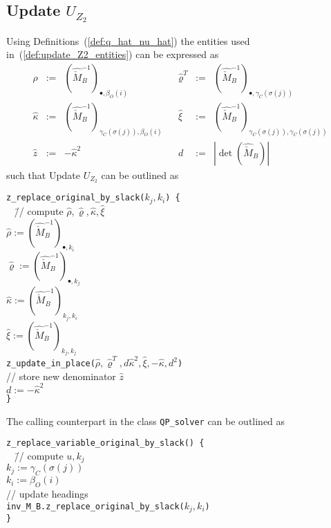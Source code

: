 \documentclass[a4paper]{article}
\begin{document}
\subsection{Update $U_{Z_{2}}$}
Using Definitions~(\ref{def:q_hat_nu_hat}) the entities used
in~(\ref{def:update_Z2_entities}) can be expressed as
\begin{equation}
\label{def:update_Z2_entities_prep}
\begin{array}{rclcrcl}
\hat{\rho}
&:=&
\left(
  \hat{\check{M}}_{B}^{-1}
\right)_{\bullet, \beta_{O}(i)}
&&
\hat{\varrho}^{T}
&:=&
\left(
  \hat{\check{M}}_{B}^{-1}
\right)_{\bullet, \gamma_{C}(\sigma(j))}
\\
\hat{\kappa}
&:=&
\left(
  \hat{\check{M}}_{B}^{-1}
\right)_{\gamma_{C}(\sigma(j)), \beta_{O}(i)}
&&
\hat{\xi}
&:=&
\left(
  \hat{\check{M}}_{B}^{-1}
\right)_{\gamma_{C}(\sigma(j)), \gamma_{C}(\sigma(j))}
\\
\hat{z}
&:=&
-\hat{\kappa}^{2}
&&
d
&:=&
\left|\det(\hat{\check{M}}_{B})\right|
\end{array}
\end{equation}
such that Update $U_{Z_{2}}$ can be outlined as
\begin{tabbing}
\texttt{z\_replace\_original\_by\_slack($k_{j}, k_{i}$) \{} \\
\texttt{  } \= // compute $\hat{\rho}, \hat{\varrho}, \hat{\kappa},
\hat{\xi}$ \\
\> \texttt{$\hat{\rho}:=
  \left(\hat{\check{M}}_{B}^{-1}\right)_{\bullet, k_{i}}$} \\
\> \texttt{$\hat{\varrho}:=
  \left(\hat{\check{M}}_{B}^{-1}\right)_{\bullet, k_{j}}$} \\
\> \texttt{$\hat{\kappa}:=
  \left(\hat{\check{M}}_{B}^{-1}\right)_{k_{j}, k_{i}}$} \\
\> \texttt{$\hat{\xi}:=
  \left(\hat{\check{M}}_{B}^{-1}\right)_{k_{j}, k_{j}}$} \\    
\> \texttt{z\_update\_in\_place($\hat{\rho}, \hat{\varrho}^{T},
d\hat{\kappa}^{2}, \hat{\xi}, -\hat{\kappa}, d^{2}$)} \\
\> // store new denominator $\hat{z}$ \\
\> \texttt{$d:=-\hat{\kappa}^{2}$} \\
\texttt{\}}
\end{tabbing}
The calling counterpart in the class \texttt{QP\_solver} can be outlined as
\begin{tabbing}
\texttt{z\_replace\_variable\_original\_by\_slack() \{} \\
\texttt{  } \= // compute $u, k_{j}$ \\
\> \texttt{$k_{j}:=\gamma_{C}(\sigma(j))$} \\
\> \texttt{$k_{i}:=\beta_{O}(i)$} \\
\> // update headings \\
\> \texttt{inv\_M\_B.z\_replace\_original\_by\_slack($k_{j}, k_{i}$)}
\\
\texttt{\}}
\end{tabbing}
\end{document}
